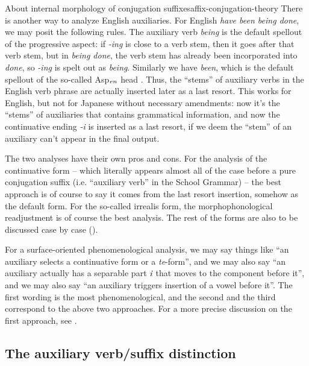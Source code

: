 \documentclass[UTF8, a4paper, oneside, scheme=plain]{ctexrep}
\newcommand{\corpus}[1]{\emph{#1}}
\begin{document}
\begin{theorybox}{About internal morphology of conjugation suffixes}{affix-conjugation-theory}
    There is another way to analyze English auxiliaries.
    For English \corpus{have been being done},
    we may posit the following rules.
    The auxiliary verb \corpus{being} is the default spellout of the progressive aspect:
    if \corpus{-ing} is close to a verb stem, then it goes after that verb stem,
    but in \corpus{being done}, the verb stem has already been incorporated into \corpus{done},
    so \corpus{-ing} is spelt out as \corpus{being}.
    Similarly we have \corpus{been}, which is the default spellout of the so-called 
    Asp$_{\text{\corpus{en}}}$ head \citep{ramchand2014152}.
    Thus, the ``stems'' of auxiliary verbs in the English verb phrase 
    are actually inserted later as a last resort.
    This works for English, but not for Japanese without necessary amendments:
    now it's the ``stems'' of auxiliaries that contains grammatical information,
    and now the continuative ending \corpus{-i} is inserted as a last resort,
    if we deem the ``stem'' of an auxiliary can't appear in the final output.

    The two analyses have their own pros and cons.
    For the analysis of the continuative form 
    -- which literally appears almost all of the case before a pure conjugation suffix
    (i.e. ``auxiliary verb'' in the School Grammar) -- 
    the best approach is of course to say 
    it comes from the last resort insertion, somehow as the default form.
    For the so-called irrealis form,
    the morphophonological readjustment is of course the best analysis.
    The rest of the forms are also to be discussed case by case ().

    For a surface-oriented phenomenological analysis,
    we may say things like ``an auxiliary selects a continuative form or a \corpus{te}-form'',
    and we may also say ``an auxiliary actually has a separable part $\corpus{i}$ 
    that moves to the component before it'',
    and we may also say ``an auxiliary triggers insertion of a vowel before it''.
    The first wording is the most phenomenological,
    and the second and the third correspond to the above two approaches.
    For a more precise discussion on the first approach, see .
\end{theorybox}

\subsection{The auxiliary verb/suffix distinction}\label{sec:auxiliary-verb-suffix}
\end{document}

